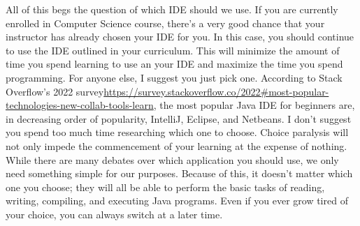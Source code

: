 All of this begs the question of which \gls{IDE} should we use.
If you are currently enrolled in Computer Science course, there's a very good chance that your instructor has already chosen your IDE for you.
In this case, you should continue to use the \gls{IDE} outlined in your curriculum.
This will minimize the amount of time you spend learning to use an your IDE and maximize the time you spend programming.
For anyone else, I suggest you just pick one.
According to Stack Overflow's 2022 survey\url{https://survey.stackoverflow.co/2022#most-popular-technologies-new-collab-tools-learn}, the most popular Java \gls{IDE} for beginners are, in decreasing order of popularity, IntelliJ, Eclipse, and Netbeans.
I don't suggest you spend too much time researching which one to choose.
Choice paralysis will not only impede the commencement of your learning at the expense of nothing.
While there are many debates over which application you should use, we only need something simple for our purposes.
Because of this, it doesn't matter which one you choose; they will all be able to perform the basic tasks of reading, writing, compiling, and executing Java programs.
Even if you ever grow tired of your choice, you can always switch at a later time.





